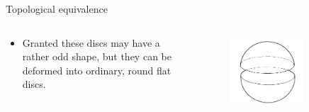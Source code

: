 \documentclass{beamer}
\begin{document}
\begin{frame}{Topological equivalence}
  \begin{columns}
    \begin{column}{0.6\textwidth}
      \begin{block}{}
        \begin{itemize}
        \item Granted these discs may have a rather odd shape, but they can be deformed into ordinary, round flat discs.
        \end{itemize}
      \end{block}
    \end{column}
    \begin{column}{0.4\textwidth}
      \begin{figure}
        \centering
        \includegraphics[width=0.7\textwidth]{figure_1_7.png}
        \caption{}
      \end{figure}
    \end{column}
  \end{columns}
\end{frame}
\end{document}
